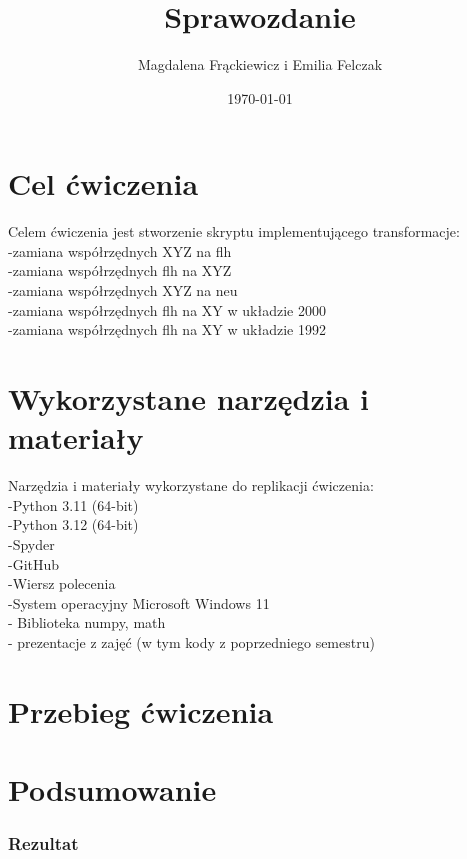 \documentclass[11pt,a4paper]{article}
\title{Sprawozdanie}
\author{Magdalena Frąckiewicz i Emilia Felczak}
\date{\today}
\begin{document}
\maketitle 
\tableofcontents 
\newpage
\section {Cel ćwiczenia}
Celem ćwiczenia jest stworzenie skryptu implementującego transformacje:\\
-zamiana współrzędnych XYZ na flh\\
-zamiana współrzędnych flh na XYZ\\
-zamiana współrzędnych XYZ na neu\\
-zamiana współrzędnych flh na XY w układzie 2000\\
-zamiana współrzędnych flh na XY w układzie 1992\\

\section {Wykorzystane narzędzia i materiały}
Narzędzia i materiały wykorzystane do replikacji ćwiczenia:\\
-Python 3.11  (64-bit)\\                                                       
-Python 3.12 (64-bit)  \\                                                                 
-Spyder  \\                                                                              
-GitHub  \\                                                                             
-Wiersz polecenia\\
-System operacyjny  Microsoft Windows 11\\
- Biblioteka numpy, math\\
- prezentacje z zajęć (w tym kody z poprzedniego semestru)\\


\section {Przebieg ćwiczenia}

\section {Podsumowanie}

\subsubsection{Rezultat}
\end{document}
